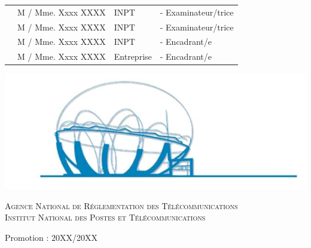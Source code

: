 \begin{center}
\begin{tabular}{p{1cm}lll}
 & \large M / Mme. Xxxx \textsc{XXXX}  & \large INPT & \large - Examinateur/trice \\[0.1cm]
 & \large M / Mme. Xxxx \textsc{XXXX}  & \large INPT & \large - Examinateur/trice \\[0.1cm]
 & \large M / Mme. Xxxx \textsc{XXXX}  & \large INPT & \large - Encadrant/e \\[0.1cm]
  & \large M / Mme. Xxxx \textsc{XXXX}  & \large Entreprise & \large - Encadrant/e \\[0.1cm]
 
\end{tabular}

\vspace{0.5cm}
\includegraphics[scale=0.6]{Logos/ZLAFA.png}


\textsc{Agence National de Réglementation des Télécommunications}\\
\textsc{Institut National des Postes et Télécommunications}

{\large Promotion : 20XX/20XX}
   
\end{center}


